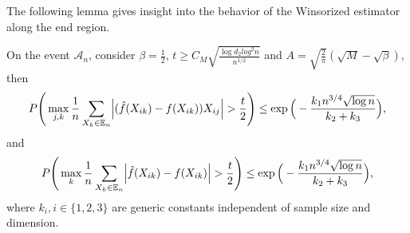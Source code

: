 The following lemma gives insight into the behavior of the Winsorized estimator along the end region.
\begin{lemma}\label{end_region}
    On the event $\mathcal{A}_n$, consider $\beta = \frac{1}{2}$, $t \geq C_M\sqrt{\frac{\log d_2 log^2 n}{n^{1/2}}}$ and $A = \sqrt{\frac{2}{\pi}}(\sqrt{M}- \sqrt{\beta})$, then
    \begin{equation*}
        P\Bigg(\max_{j,k} \frac{1}{n} \sum_{X_k \in \mathbb{E}_n} \abs{(\hat{f}(X_{ik}) - f(X_{ik}))X_{ij}} > \frac{t}{2}\Bigg) \leq \exp\Big(- \frac{k_1 n^{3/4} \sqrt{\log n}}{k_2+ k_3} \Big),
    \end{equation*}
    and
    \begin{equation*}
        P\Bigg(\max_{k} \frac{1}{n} \sum_{X_k \in \mathbb{E}_n} \abs{\hat{f}(X_{ik}) - f(X_{ik})} > \frac{t}{2}\Bigg) \leq \exp\Big(- \frac{k_1 n^{3/4} \sqrt{\log n}}{k_2+ k_3} \Big),
    \end{equation*}
    where $k_i, i \in \{1,2,3\}$ are generic constants independent of sample size and dimension.


\end{lemma}
